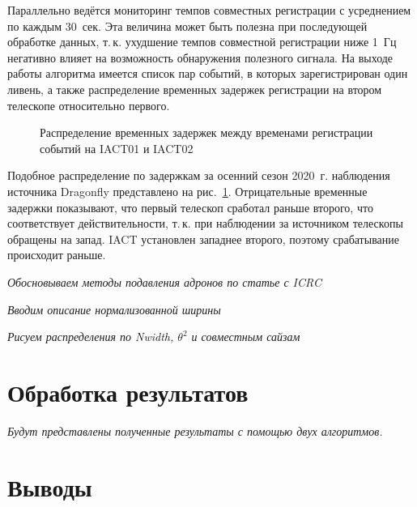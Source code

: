 \documentclass[magd,floatypics,numeref]{msudipl} %
\begin{document}
Параллельно ведётся мониторинг темпов совместных регистрации с усреднением по каждым 30~сек. Эта величина может быть полезна при последующей обработке данных, т.\,к. ухудшение темпов совместной регистрации ниже 1~Гц негативно влияет на возможность обнаружения полезного сигнала. На выходе работы алгоритма имеется список пар событий, в которых зарегистрирован один ливень, а также распределение временных задержек регистрации  на втором телескопе относительно первого.
\begin{figure}[t]
	\noindent{}
	\caption{Распределение временных задержек между временами регистрации событий на IACT01 и IACT02}
	\label{pic:iactDeltas}
\end{figure}
Подобное распределение по задержкам за осенний сезон 2020~г. наблюдения источника Dragonfly представлено на рис.~\ref{pic:iactDeltas}\afterpage{\clearpage}. Отрицательные временные задержки показывают, что первый телескоп сработал раньше второго, что соответствует действительности, т.\,к. при наблюдении за источником телескопы обращены на запад.  IACT установлен западнее второго, поэтому срабатывание происходит раньше. 


\textit{Обосновываем методы подавления адронов по статье с ICRC}

\textit{Вводим описание нормализованной ширины}

\textit{Рисуем распределения по Nwidth, $\theta^2$ и совместным сайзам}
 
\chapter{Обработка результатов}
\textit{Будут представлены полученные результаты с помощью двух алгоритмов. }
\chapter*{Выводы}   %


{}  %
\printbibliography[title=Литература]
\end{document}
